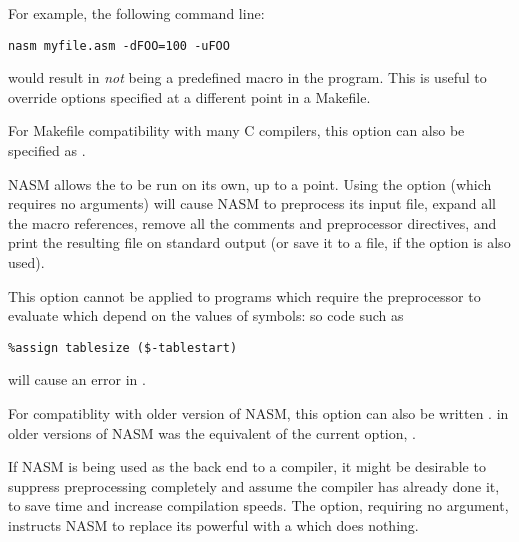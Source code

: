 For example, the following command line:

\begin{lstlisting}
nasm myfile.asm -dFOO=100 -uFOO
\end{lstlisting}

would result in  \emph{not} being a predefined macro in the
program. This is useful to override options specified at a different
point in a Makefile.

For Makefile compatibility with many C compilers, this option can also
be specified as .


NASM allows the  to be run on its own, up to a
point. Using the  option (which requires no arguments) will
cause NASM to preprocess its input file, expand all the macro references,
remove all the comments and preprocessor directives, and print the resulting
file on standard output (or save it to a file, if the  option
is also used).

This option cannot be applied to programs which require the
preprocessor to evaluate 
 which depend on the values of symbols:
so code such as

\begin{lstlisting}
%assign tablesize ($-tablestart)
\end{lstlisting}

will cause an error in .

For compatiblity with older version of NASM, this option can also be
written .  in older versions of NASM was the equivalent
of the current  option, .


If NASM is being used as the back end to a compiler, it might be
desirable to suppress preprocessing
completely and assume the compiler has already done it, to save time
and increase compilation speeds. The  option, requiring no
argument, instructs NASM to replace its powerful 
with a  which does nothing.



